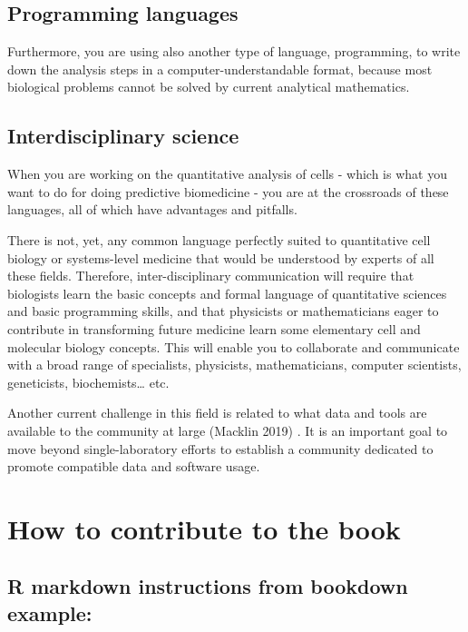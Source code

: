 \documentclass[
]{book}
\begin{document}
\hypertarget{programming-languages}{%
\section{Programming languages}\label{programming-languages}}

Furthermore, you are using also another type of language, programming, to write down the analysis steps in a computer-understandable format, because most biological problems cannot be solved by current analytical mathematics.

\hypertarget{interdisciplinary-science}{%
\section{Interdisciplinary science}\label{interdisciplinary-science}}

When you are working on the quantitative analysis of cells - which is what you want to do for doing predictive biomedicine - you are at the crossroads of these languages, all of which have advantages and pitfalls.

There is not, yet, any common language perfectly suited to quantitative cell biology or systems-level medicine that would be understood by experts of all these fields. Therefore, inter-disciplinary communication will require that biologists learn the basic concepts and formal language of quantitative sciences and basic programming skills, and that physicists or mathematicians eager to contribute in transforming future medicine learn some elementary cell and molecular biology concepts. This will enable you to collaborate and communicate with a broad range of specialists, physicists, mathematicians, computer scientists, geneticists, biochemists\ldots{} etc.

Another current challenge in this field is related to what data and tools are available to the community at large (Macklin 2019) . It is an important goal to move beyond single-laboratory efforts to establish a community dedicated to promote compatible data and software usage.

\hypertarget{intro}{%
\chapter{How to contribute to the book}\label{intro}}

\hypertarget{r-markdown-instructions-from-bookdown-example}{%
\section{R markdown instructions from bookdown example:}\label{r-markdown-instructions-from-bookdown-example}}
\end{document}
